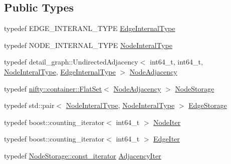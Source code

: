 \subsection*{Public Types}
\begin{DoxyCompactItemize}
\item 
typedef E\+D\+G\+E\+\_\+\+I\+N\+T\+E\+R\+A\+N\+L\+\_\+\+T\+Y\+P\+E \hyperlink{structnifty_1_1graph_1_1detail__graph_1_1UndirectedGraphTypeHelper_ac7309a31e7a003860ce1f1a882e6813e}{Edge\+Internal\+Type}
\item 
typedef N\+O\+D\+E\+\_\+\+I\+N\+T\+E\+R\+N\+A\+L\+\_\+\+T\+Y\+P\+E \hyperlink{structnifty_1_1graph_1_1detail__graph_1_1UndirectedGraphTypeHelper_a4c2041ab030e3eb561a2955a3bbfb5d7}{Node\+Interal\+Type}
\item 
typedef detail\+\_\+graph\+::\+Undirected\+Adjacency$<$ int64\+\_\+t, int64\+\_\+t, \hyperlink{structnifty_1_1graph_1_1detail__graph_1_1UndirectedGraphTypeHelper_a4c2041ab030e3eb561a2955a3bbfb5d7}{Node\+Interal\+Type}, \hyperlink{structnifty_1_1graph_1_1detail__graph_1_1UndirectedGraphTypeHelper_ac7309a31e7a003860ce1f1a882e6813e}{Edge\+Internal\+Type} $>$ \hyperlink{structnifty_1_1graph_1_1detail__graph_1_1UndirectedGraphTypeHelper_a626e3edd4cc8c7e33ec89e6a7454561a}{Node\+Adjacency}
\item 
typedef \hyperlink{classnifty_1_1container_1_1FlatSet}{nifty\+::container\+::\+Flat\+Set}$<$ \hyperlink{structnifty_1_1graph_1_1detail__graph_1_1UndirectedGraphTypeHelper_a626e3edd4cc8c7e33ec89e6a7454561a}{Node\+Adjacency} $>$ \hyperlink{structnifty_1_1graph_1_1detail__graph_1_1UndirectedGraphTypeHelper_a55013bcacc1d016637b29ab2c33ac52a}{Node\+Storage}
\item 
typedef std\+::pair$<$ \hyperlink{structnifty_1_1graph_1_1detail__graph_1_1UndirectedGraphTypeHelper_a4c2041ab030e3eb561a2955a3bbfb5d7}{Node\+Interal\+Type}, \hyperlink{structnifty_1_1graph_1_1detail__graph_1_1UndirectedGraphTypeHelper_a4c2041ab030e3eb561a2955a3bbfb5d7}{Node\+Interal\+Type} $>$ \hyperlink{structnifty_1_1graph_1_1detail__graph_1_1UndirectedGraphTypeHelper_a43eb7f2cfb5036f87e9496bb6b8d064d}{Edge\+Storage}
\item 
typedef boost\+::counting\+\_\+iterator$<$ int64\+\_\+t $>$ \hyperlink{structnifty_1_1graph_1_1detail__graph_1_1UndirectedGraphTypeHelper_a33768d5fbeda97627a0e4a67eb50776c}{Node\+Iter}
\item 
typedef boost\+::counting\+\_\+iterator$<$ int64\+\_\+t $>$ \hyperlink{structnifty_1_1graph_1_1detail__graph_1_1UndirectedGraphTypeHelper_adcb9afc6e254d52edcb21e1be522dce7}{Edge\+Iter}
\item 
typedef \hyperlink{classnifty_1_1container_1_1FlatSet_a0f4cd26da060859b18742abfd534aa24}{Node\+Storage\+::const\+\_\+iterator} \hyperlink{structnifty_1_1graph_1_1detail__graph_1_1UndirectedGraphTypeHelper_aae80a660c99b4e51c90a98f70496a8ea}{Adjacency\+Iter}
\end{DoxyCompactItemize}



